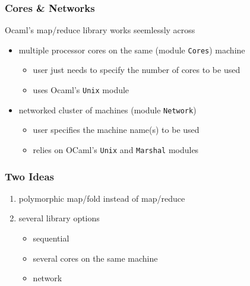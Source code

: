 \documentclass{beamer}
\begin{document}
\begin{frame}\frametitle{Cores \& Networks}
  Ocaml's map/reduce library works seemlessly across

  \bigskip
  \begin{itemize}
  \item multiple processor cores on the same (module \texttt{Cores})
    machine
    \begin{itemize}
    \item user just needs to specify the number of cores to be used
    \item uses Ocaml's \texttt{Unix} module
    \end{itemize}

    \bigskip
  \item networked cluster of machines (module \texttt{Network})
    \begin{itemize}
    \item user specifies the machine name(s) to be used
    \item relies on OCaml's \texttt{Unix} and \texttt{Marshal} modules
    \end{itemize}
  \end{itemize}
\end{frame}


\begin{frame}\frametitle{Two Ideas}
  \begin{enumerate}
  \item polymorphic map/fold instead of map/reduce

    \bigskip
  \item several library options
    \begin{itemize}
    \item sequential 
    \item several cores on the same machine
    \item network
    \end{itemize}
  \end{enumerate}
\end{frame}
\end{document}
